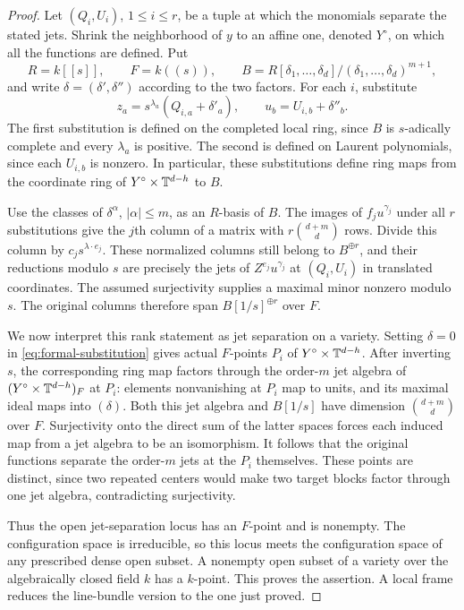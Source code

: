\begin{proof}
Let $(Q_i,U_i)$, $1\leq i\leq r$, be a tuple at which the monomials
separate the stated jets.  Shrink the neighborhood of $y$ to an affine
one, denoted $Y^\circ$, on which all the functions are defined.  Put
\[
 R=k[[s]],\qquad F=k((s)),\qquad
 B=R[\delta_1,\ldots,\delta_d]/(\delta_1,\ldots,\delta_d)^{m+1},
\]
and write $\delta=(\delta',\delta'')$ according to the two factors.
For each $i$, substitute
\begin{equation}\label{eq:formal-substitution}
 z_a=s^{\lambda_a}(Q_{i,a}+\delta'_a),\qquad
 u_b=U_{i,b}+\delta''_b.
\end{equation}
The first substitution is defined on the completed local ring, since
$B$ is $s$-adically complete and every $\lambda_a$ is positive.  The
second is defined on Laurent polynomials, since each $U_{i,b}$ is
nonzero.  In particular, these substitutions define ring maps from the
coordinate ring of $Y^\circ\times\mathbb T^{d-h}$ to $B$.

Use the classes of $\delta^\alpha$, $|\alpha|\leq m$, as an $R$-basis
of $B$.  The images of $f_ju^{\gamma_j}$ under all $r$ substitutions
give the $j$th column of a matrix with $r\binom{d+m}{d}$ rows.  Divide
this column by $c_js^{\lambda\cdot e_j}$.  These normalized columns
still belong to $B^{\oplus r}$, and their reductions modulo $s$ are precisely the jets
of $Z^{e_j}u^{\gamma_j}$ at $(Q_i,U_i)$ in translated coordinates.
The assumed surjectivity supplies a maximal minor nonzero modulo $s$.
The original columns therefore span $B[1/s]^{\oplus r}$ over $F$.

We now interpret this rank statement as jet separation on a variety.
Setting $\delta=0$ in \eqref{eq:formal-substitution} gives actual
$F$-points $P_i$ of $Y^\circ\times\mathbb T^{d-h}$.  After inverting $s$, the
corresponding ring map factors through the order-$m$ jet algebra of
$(Y^\circ\times\mathbb T^{d-h})_F$ at $P_i$: elements nonvanishing at $P_i$
map to units, and its maximal
ideal maps into $(\delta)$.  Both this jet algebra and $B[1/s]$ have
dimension $\binom{d+m}{d}$ over $F$.  Surjectivity onto the direct sum
of the latter spaces forces each induced map from a jet algebra to be
an isomorphism.  It follows that the original functions separate the
order-$m$ jets at the $P_i$ themselves.  These points are distinct,
since two repeated centers would make two target blocks factor through
one jet algebra, contradicting surjectivity.

Thus the open jet-separation locus has an $F$-point and is nonempty.
The configuration space is irreducible, so this locus meets the
configuration space of any prescribed dense open subset.  A nonempty
open subset of a variety over the algebraically closed field $k$ has a
$k$-point.  This proves the assertion.  A local frame reduces the
line-bundle version to the one just proved.
\end{proof}

